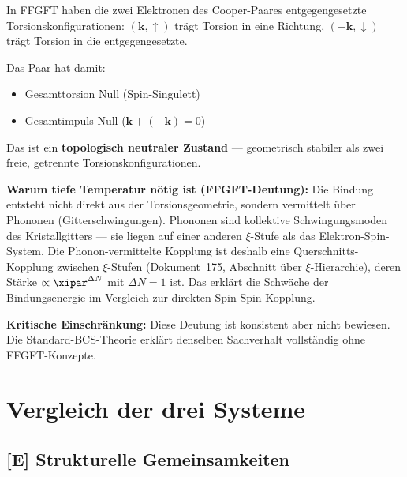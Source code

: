 \begin{foundation}
In FFGFT haben die zwei Elektronen des Cooper-Paares
entgegengesetzte Torsionskonfigurationen:
$(\mathbf{k}, \uparrow)$ trägt Torsion in eine Richtung,
$(-\mathbf{k}, \downarrow)$ trägt Torsion in die entgegengesetzte.

Das Paar hat damit:
\begin{itemize}
  \item Gesamttorsion Null (Spin-Singulett)
  \item Gesamtimpuls Null ($\mathbf{k} + (-\mathbf{k}) = 0$)
\end{itemize}

Das ist ein \textbf{topologisch neutraler Zustand} ---
geometrisch stabiler als zwei freie, getrennte Torsionskonfigurationen.

\textbf{Warum tiefe Temperatur nötig ist (FFGFT-Deutung):}
Die Bindung entsteht nicht direkt aus der Torsionsgeometrie,
sondern vermittelt über Phononen (Gitterschwingungen).
Phononen sind kollektive Schwingungsmoden des Kristallgitters ---
sie liegen auf einer anderen $\xi$-Stufe als das Elektron-Spin-System.
Die Phonon-vermittelte Kopplung ist deshalb eine
Querschnitts-Kopplung zwischen $\xi$-Stufen
(Dokument~175, Abschnitt über $\xi$-Hierarchie),
deren Stärke $\propto \xipar^{\Delta N}$ mit $\Delta N = 1$ ist.
Das erklärt die Schwäche der Bindungsenergie
im Vergleich zur direkten Spin-Spin-Kopplung.

\textbf{Kritische Einschränkung:}
Diese Deutung ist konsistent aber nicht bewiesen.
Die Standard-BCS-Theorie erklärt denselben Sachverhalt
vollständig ohne FFGFT-Konzepte.
\end{foundation}

\section{Vergleich der drei Systeme}
\label{sec:vergleich}

\subsection{[E] Strukturelle Gemeinsamkeiten}


